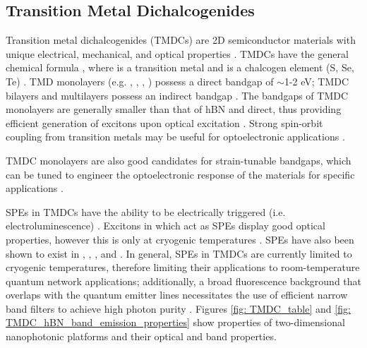 \documentclass[]{article}
\begin{document}
\subsection{Transition Metal Dichalcogenides}
Transition metal dichalcogenides (TMDCs) are 2D semiconductor materials with unique electrical, mechanical, and optical properties \cite{synthesis_TMDC}. TMDCs have the general chemical formula , where  is a transition metal and  is a chalcogen element (S, Se, Te) \cite{electronic_properties_2D_materials_TMDCs}. TMD monolayers (e.g. , 
, , ) possess a direct bandgap of $\sim$1-2 eV; TMDC bilayers and multilayers possess an indirect bandgap \cite{electronic_properties_2D_materials_TMDCs, 2D_material_nanophotonics_HBN_BANDGAP}. The bandgaps of TMDC monolayers are generally smaller than that of hBN and direct, thus providing efficient generation of excitons upon optical excitation \cite{2D_materials_for_quantum_information_science}. Strong spin-orbit coupling from transition metals may be useful for optoelectronic applications \cite{2D_material_nanophotonics_HBN_BANDGAP}. 
\newline


TMDC monolayers are also good candidates for strain-tunable bandgaps, which can be tuned to engineer the optoelectronic response of the materials for specific applications \cite{electronic_properties_2D_materials_TMDCs, 2D_material_nanophotonics_HBN_BANDGAP, 2D_materials_for_quantum_information_science}.
\newline

SPEs in TMDCs have the ability to be electrically triggered (i.e. electroluminescence) \cite{2D_materials_for_quantum_information_science}. Excitons in  which act as SPEs display good optical properties, however this is only at cryogenic temperatures \cite{2D_materials_for_quantum_information_science}. SPEs have also been shown to exist in , , ,  and  \cite{2D_materials_for_quantum_information_science, Single_quantum_emitters_monolayer_semiconductors_WSe2_MoS2, Single_defect_emitters_WSe2, WSe2_QE_hBN, SPE_silicon_nitride_photonic_chip, WS2_electrically_driven_photon_emission, SPE_GaSe}. In general, SPEs in TMDCs are currently limited to cryogenic temperatures, therefore limiting their applications to room-temperature quantum network applications; additionally, a broad fluorescence background that overlaps with the quantum
emitter lines necessitates the use of efficient narrow band filters to achieve high photon purity \cite{SP_sources_atomically_thin_materials_review}. Figures \ref{fig: TMDC_table} and \ref{fig: TMDC_hBN_band_emission_properties} show properties of two-dimensional nanophotonic platforms and their optical and band properties.
\end{document}
